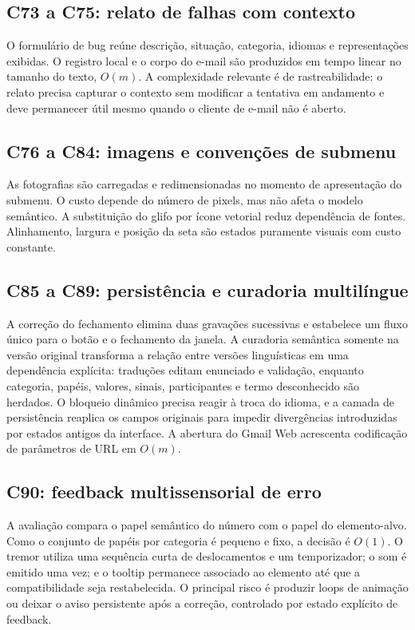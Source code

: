 \documentclass[12pt,a4paper]{article}
\begin{document}
\subsection{C73 a C75: relato de falhas com contexto}
O formulário de bug reúne descrição, situação, categoria, idiomas e representações exibidas. O registro local e o corpo do e-mail são produzidos em tempo linear no tamanho do texto, $O(m)$. A complexidade relevante é de rastreabilidade: o relato precisa capturar o contexto sem modificar a tentativa em andamento e deve permanecer útil mesmo quando o cliente de e-mail não é aberto.

\subsection{C76 a C84: imagens e convenções de submenu}
As fotografias são carregadas e redimensionadas no momento de apresentação do submenu. O custo depende do número de pixels, mas não afeta o modelo semântico. A substituição do glifo por ícone vetorial reduz dependência de fontes. Alinhamento, largura e posição da seta são estados puramente visuais com custo constante.

\subsection{C85 a C89: persistência e curadoria multilíngue}
A correção do fechamento elimina duas gravações sucessivas e estabelece um fluxo único para o botão e o fechamento da janela. A curadoria semântica somente na versão original transforma a relação entre versões linguísticas em uma dependência explícita: traduções editam enunciado e validação, enquanto categoria, papéis, valores, sinais, participantes e termo desconhecido são herdados. O bloqueio dinâmico precisa reagir à troca do idioma, e a camada de persistência reaplica os campos originais para impedir divergências introduzidas por estados antigos da interface. A abertura do Gmail Web acrescenta codificação de parâmetros de URL em $O(m)$.

\subsection{C90: feedback multissensorial de erro}
A avaliação compara o papel semântico do número com o papel do elemento-alvo. Como o conjunto de papéis por categoria é pequeno e fixo, a decisão é $O(1)$. O tremor utiliza uma sequência curta de deslocamentos e um temporizador; o som é emitido uma vez; e o tooltip permanece associado ao elemento até que a compatibilidade seja restabelecida. O principal risco é produzir loops de animação ou deixar o aviso persistente após a correção, controlado por estado explícito de feedback.
\end{document}
